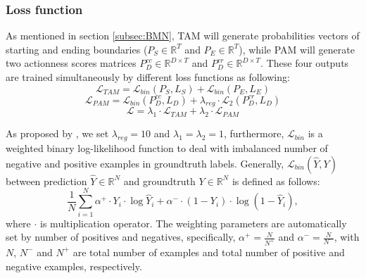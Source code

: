 \documentclass{ieeeaccess}
\begin{document}
\subsubsection{Loss function}

As mentioned in section \ref{subsec:BMN}, TAM will generate probabilities vectors of starting and ending boundaries ($P_S \in \mathbb{R}^T$ and $P_E\in \mathbb{R}^T$), while PAM will generate two actionness scores matrices $P^{cc}_D \in \mathbb{R}^{D\times T}$ and $P^{cr}_D\in \mathbb{R}^{D\times T}$. These four outputs are trained simultaneously by different loss functions as following:
\begin{equation}
    \mathcal{L}_{TAM} = \mathcal{L}_{bin}(P_S, L_S) + \mathcal{L}_{bin}(P_E, L_E)
\end{equation}
\begin{equation}
    \mathcal{L}_{PAM} = \mathcal{L}_{bin}(P^{cc}_D, L_D) + \lambda_{reg} \cdot \mathcal{L}_{2}(P^{cr}_D, L_D)
\end{equation}
\begin{equation}
    \mathcal{L} = \lambda_1 \cdot \mathcal{L}_{TAM} + \lambda_2 \cdot \mathcal{L}_{PAM}
\end{equation}

As proposed by \cite{bmn, lin2018bsn}, we set $\lambda_{reg} = 10$ and $\lambda_1 = \lambda_2 = 1$, furthermore, $\mathcal{L}_{bin}$ is a weighted binary log-likelihood function to deal with imbalanced number of negative and positive examples in groundtruth labels. Generally, $\mathcal{L}_{bin}(\hat{Y}, Y)$ between prediction $\hat{Y} \in \mathbb{R}^N$ and groundtruth $Y \in \mathbb{R}^N$ is defined as follows:
\begin{equation}
     \frac{1}{N} \sum\limits^{N}_{i=1} \alpha^{+} \cdot Y_i \cdot \log{\hat{Y}_i} + \alpha^{-} \cdot (1 - Y_i) \cdot \log{(1-\hat{Y}_i)},
\end{equation}
where $\cdot$ is multiplication operator. The weighting parameters are automatically set by number of positives and negatives, specifically, $\alpha^{+} = \frac{N}{N^{+}}$ and $\alpha^{-} = \frac{N}{N^{-}}$, with $N$, $N^-$ and $N^+$ are total number of examples and total number of positive and negative examples, respectively.
\end{document}
